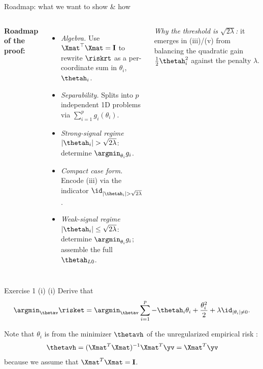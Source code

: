 \documentclass[aspectratio=169]{beamer}
\newcommand{\thetahi}{\thetah_i}
\newcommand{\thetai}{\theta_i}
\newcommand{\thetainnz}{\id_{|\theta_i| \neq 0}}
\newcommand{\Imat}{\mathbf{I}}
\newcommand{\sumip}{\sum_{i=1}^p}
\begin{document}
\begin{frame}{Roadmap: what we want to show \& how}
\begin{columns}[T]
		\textbf{Roadmap of the proof:}
		\begin{itemize}\setlength{\itemsep}{2pt}\setlength{\parskip}{0pt}
			\item[\textbf{(i)}] \textit{Algebra.} Use $\Xmat^\top\Xmat = \Imat$ to rewrite $\riskrt$ as a per-coordinate sum in $\thetai$, $\thetahi$.
			\item[\textbf{(ii)}] \textit{Separability.} Splits into $p$ independent 1D problems via $\sum_{i=1}^p g_i(\thetai)$.
			\item[\textbf{(iii)}] \textit{Strong-signal regime} $|\thetahi| > \sqrt{2\lambda}$: determine $\argmin_{\thetai} g_i$.
			\item[\textbf{(iv)}] \textit{Compact case form.} Encode (iii) via the indicator $\id_{|\thetahi|>\sqrt{2\lambda}}$.
			\item[\textbf{(v)}] \textit{Weak-signal regime} $|\thetahi| \leq \sqrt{2\lambda}$: determine $\argmin_{\thetai} g_i$; assemble the full $\thetah_{L0}$.
		\end{itemize}

		\medskip
		\textit{Why the threshold is $\sqrt{2\lambda}$:} it emerges in (iii)/(v) from balancing the quadratic gain $\tfrac{1}{2}\thetahi^2$ against the penalty $\lambda$.
	\end{columns}
\end{frame}

\begin{frame}{Exercise 1 (i)}
	(i) Derive that 
	\begin{align*}
		\argmin_{\thetav} \risket = \argmin_{\thetav} \sumip - \thetahi \thetai + \frac{\thetai^2}{2} + \lambda \thetainnz.
	\end{align*}
	
	Note that $\thetai$ is from the minimizer $\thetavh$ of the unregularized empirical risk :
	\begin{align*}
		\thetavh = (\Xmat^T \Xmat)^{-1} \Xmat^T \yv = \Xmat^T \yv
	\end{align*}
	because we assume that $\Xmat^T \Xmat = \Imat$.
\end{frame}
\end{document}
